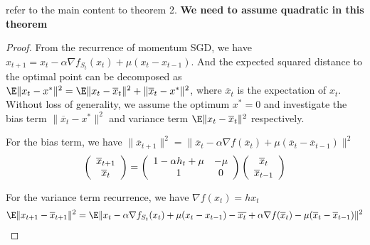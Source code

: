 \begin{theorem}
refer to the main content to theorem 2. \textbf{We need to assume quadratic in this theorem}
\begin{proof}
	From the recurrence of momentum SGD, we have $x_{t+1} = x_t - \alpha \nabla f_{S_t} (x_t) + \mu (x_t - x_{t-1})$. And the expected squared distance to the optimal point can be decomposed as $\E \| x_t - x^* \|^2 = \E \| x_t - \overline{x}_t \|^2 + \| \overline{x}_t- x^* \|^2$, where $\overline{x}_t$ is the expectation of $x_t$.
	Without loss of generality, we assume the optimum $x^*=0$ and investigate the bias term $\| \overline{x}_t- x^* \|^2$ and variance term $\E \| x_t - \overline{x}_t \|^2$ respectively.
	
	For the bias term, we have $\| \overline{x}_{t + 1} \|^2 = \| \overline{x}_t - \alpha \nabla f( \overline{x}_t) + \mu ( \overline{x}_t -  \overline{x}_{t - 1})\|^2$
	\begin{equation}
		\left(\begin{array}{c}
		 \overline{x}_{t+1} \\
		 \overline{x}_{t}	
		\end{array}\right) =
		\left(\begin{array}{c c}
			1 - \alpha h_t + \mu & - \mu \\
			1 & 0
		\end{array}\right)
		\left(\begin{array}{c}
		 \overline{x}_{t} \\
		 \overline{x}_{t-1}	
		\end{array}\right)
	\end{equation}
	
	For the variance term recurrence, we have $\nabla f(x_t) = h x_t$ 
	\begin{equation}
		\begin{aligned}
			\E \| x_{t + 1} - \overline{x}_{t + 1} \|^2 = \E \| x_{t} - \alpha \nabla f_{S_t}(x_t) + \mu (x_{t} - x_{t - 1})
				- \overline{x_t} + \alpha \nabla f(\overline{x}_t) - \mu (
				\overline{x}_t - \overline{x}_{t - 1}) \|^2 
		\end{aligned}
	\end{equation} 
\end{proof}

\end{theorem}







